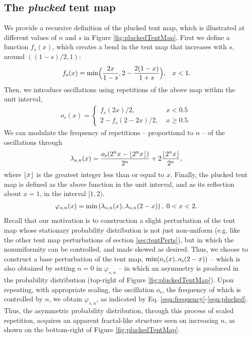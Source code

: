 \subsection{The \emph{plucked} tent map}
\label{sec:pluckedTentMap}
We provide a recursive definition of the plucked tent map, which 
is illustrated at different values of $n$ and $s$ in Figure \ref{fig:pluckedTentMap}. First we define a function $f_s(x)$, which 
creates a bend in the tent map that increases with $s$, around 
$((1-s)/2,1)$:
\begin{align}
		f_s(x) = 		{\rm min}\Big(
				\dfrac{2x}{1-s}, 2 - \dfrac{2(1-x)}{1+s}\Big),
				\;\;\; x < 1. 
\end{align}
Then, we introduce oscillations using repetitions of
the above map within the unit interval,
\begin{align}
		o_s(x) = \begin{cases}
				f_s(2x)/2, & \; x < 0.5 \\
				2 - f_s(2-2x)/2, & \; x \ge 0.5.
		\end{cases}
\end{align}
We can modulate
the frequency of repetitions -- proportional to $n$ -- 
of the oscillations through
\begin{align}
		\label{eqn:frequency}
		\lambda_{s,n}(x) = \dfrac{o_s(2^n x - \floor*{2^n x})}{2^n} 
		+ 2 \frac{\floor*{2^n x}}{2^n},
\end{align}
where $\floor*{x}$ is the greatest integer less than or equal to $x$.
Finally, the plucked tent map is defined as the above function 
in the unit interval, and as its reflection about $x=1$,
in the interval $[1,2)$.
\begin{align}
		\label{eqn:plucked}
		\varphi_{s,n}(x) = {\rm min}\left(
		\lambda_{s,n}(x), \lambda_{s,n}(2-x)\right), \; 0< x < 2. 
\end{align}
Recall that our motivation is to construction a slight perturbation of the tent map whose stationary probability distribution is not just 
non-uniform (e.g. like the other tent map perturbations of section \ref{sec:tentPerts}), but in which the nonuniformity can be controlled, and made skewed as desired. Thus, we choose to construct a base perturbation of the tent map, ${\rm min}(o_s(x), o_s(2-x))$ -- 
which is also obtained by setting $n=0$ in $\varphi_{s,n}$ --  
in which an asymmetry is produced in the probability distribution (top-right of Figure \ref{fig:pluckedTentMap}).
Upon repeating, with appropriate scaling, the oscillation $o_s$, 
the frequency of which is controlled by $n$, we obtain $\varphi_{s,n}$, 
as indicated by Eq. \ref{eqn:frequency}-\ref{eqn:plucked}. Thus, the asymmetric probability distribution, through this process of scaled repetition, acquires an apparent fractal-like structure seen on increasing $n$, as shown on the bottom-right of Figure \ref{fig:pluckedTentMap}.

